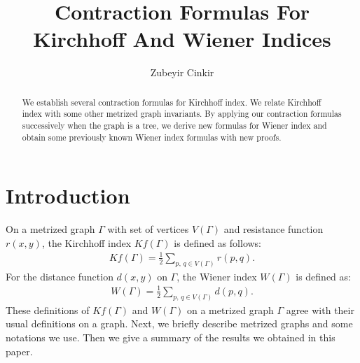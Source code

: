 \documentclass[12pt]{amsart}
\theoremstyle{example}
\theoremstyle{definition}
\theoremstyle{notation}
\begin{document}
\title[Contraction Formulas For Kirchhoff And Wiener Indices ]
{Contraction Formulas For Kirchhoff And Wiener Indices}

\author{Zubeyir Cinkir}
\address{Zubeyir Cinkir\\
Zirve University\\
Faculty of Education\\
Department of Mathematics\\
Gaziantep\\
TURKEY.}


\begin{abstract}
We establish several contraction formulas for Kirchhoff index.
We relate Kirchhoff index with some other metrized graph invariants.
By applying our contraction formulas successively when the graph is a tree, we derive new formulas for Wiener index and obtain some
previously known Wiener index formulas with new proofs.
\end{abstract}

\maketitle

\section{Introduction}\label{section introduction}

On a metrized graph ${\Gamma}$ with set of vertices ${V({\Gamma})}$ and resistance function $r(x,y)$, the Kirchhoff index $Kf({\Gamma})$ is defined as follows:
\begin{equation*}\label{eqn KIndex definition0}
\begin{split}
Kf({\Gamma})=\frac{1}{2}\sum_{p,\, q \in {V({\Gamma})}}r(p,q).
\end{split}
\end{equation*}
For the distance function $d(x,y)$ on ${\Gamma}$, the Wiener index $W({\Gamma})$ is defined as:
\begin{equation*}\label{eqn WIndex definition0}
\begin{split}
W({\Gamma})=\frac{1}{2}\sum_{p,\, q \in {V({\Gamma})}}d(p,q).
\end{split}
\end{equation*}
These definitions of $Kf({\Gamma})$ and $W({\Gamma})$ on a metrized graph ${\Gamma}$ agree with their usual definitions on a graph. Next, we briefly describe metrized graphs and some notations we use. Then we give a summary of the results we obtained in this paper.
\end{document}
